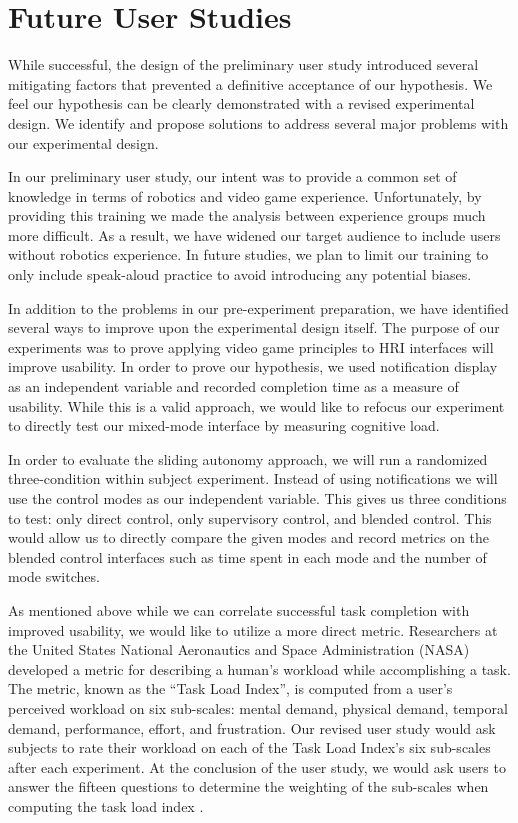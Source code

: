 \section{Future User Studies}
\label{sec:futurestudy}
While successful, the design of the preliminary user study introduced several mitigating factors that prevented a definitive acceptance of our hypothesis. We feel our hypothesis can be clearly demonstrated with a revised experimental design. We identify and propose solutions to address several major problems with our experimental design.

In our preliminary user study, our intent was to provide a common set of knowledge in terms of robotics and video game experience. Unfortunately, by providing this training we made the analysis between experience groups much more difficult. As a result, we have widened our target audience to include users without robotics experience. In future studies, we plan to limit our training to only include speak-aloud practice to avoid introducing any potential biases.

In addition to the problems in our pre-experiment preparation, we have identified several ways to improve upon the experimental design itself. The purpose of our experiments was to prove applying video game principles to HRI interfaces will improve usability. In order to prove our hypothesis, we used notification display as an independent variable and recorded completion time as a measure of usability. While this is a valid approach, we would like to refocus our experiment to directly test our mixed-mode interface by measuring cognitive load. 

In order to evaluate the sliding autonomy approach, we will run a randomized three-condition within subject experiment. Instead of using notifications we will use the control modes as our independent variable. This gives us three conditions to test: only direct control, only supervisory control, and blended control. This would allow us to directly compare the given modes and record metrics on the blended control interfaces such as time spent in each mode and the number of mode switches.

As mentioned above while we can correlate successful task completion with improved usability, we would like to utilize a more direct metric. Researchers at the United States National Aeronautics and Space Administration (NASA) developed a metric for describing a human's workload while accomplishing a task. The metric, known as the ``Task Load Index'', is computed from a user's perceived workload on six sub-scales: mental demand, physical demand, temporal demand, performance, effort, and frustration. \cite{NASA_TLX} Our revised user study would ask subjects to rate their workload on each of the Task Load Index's six sub-scales after each experiment. At the conclusion of the user study, we would ask users to answer the fifteen questions to determine the weighting of the sub-scales when computing the task load index \cite{NASA_TLX20}.

